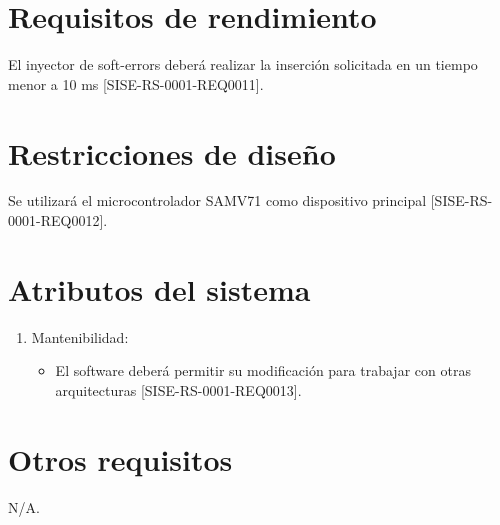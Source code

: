 \section{Requisitos de rendimiento}

El inyector de soft-errors deberá realizar la inserción solicitada en un tiempo menor a 10 ms [SISE-RS-0001-REQ0011].

\section{Restricciones de diseño}

Se utilizará el microcontrolador SAMV71 como dispositivo principal [SISE-RS-0001-REQ0012].

\section{Atributos del sistema}

\begin{enumerate}
	\item Mantenibilidad:
		\begin{itemize}
			\item El software deberá permitir su modificación para trabajar con otras arquitecturas [SISE-RS-0001-REQ0013].
		\end{itemize}
\end{enumerate}

\section{Otros requisitos}

N/A.